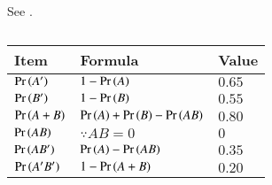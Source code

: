 See
.
\begin{table}[ht]
\centering
\caption{}
\label{tab:11/16/3/7}
\begin{tabular}{|l|l|l|}
\hline
	\textbf{Item} & \textbf{Formula} & \textbf{Value} \\
\hline
$\Pr\left(A'\right)$ & $1-\Pr\left(A\right)$ & $0.65$ \\
\hline
$\Pr\left(B'\right)$ & $1-\Pr\left(B\right)$ & $0.55$ \\
\hline
$\Pr\left(A+B\right)$& $\Pr\left(A\right)+\Pr\left(B\right)-\Pr\left(AB\right)$ & $0.80$ \\
\hline
$\Pr\left(AB\right)$ & $\because AB = 0$ & $0$ \\
\hline
$\Pr\left(AB'\right)$ & $\Pr\left(A\right)-\Pr\left(AB\right)$& $0.35$ \\
\hline
$\Pr\left(A'B'\right)$ & $1-\Pr\left(A+B\right)$ & $0.20$ \\
\hline
\end{tabular}
\end{table}
